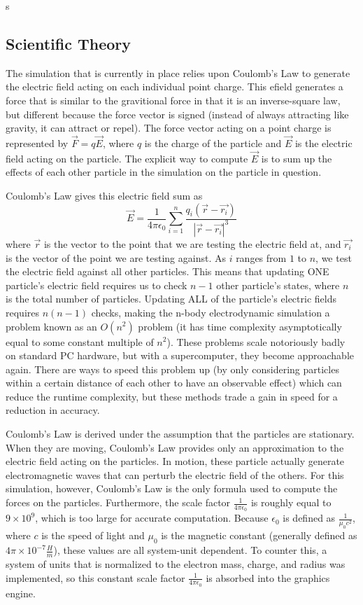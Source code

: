 s\documentclass[10pt]{article}
\begin{document}
\clearpage
\subsection{Scientific Theory}
The simulation that is currently in place relies upon Coulomb's Law to generate the electric field acting on each individual point charge. This efield generates a force that is similar to the gravitional force in that it is an inverse-square law, but different because the force vector is signed (instead of always attracting like gravity, it can attract or repel). The force vector acting on a point charge is represented by $\vec{F} = q\vec{E}$, where $q$ is the charge of the particle and $\vec{E}$ is the electric field acting on the particle. The explicit way to compute $\vec{E}$ is to sum up the effects of each other particle in the simulation on the particle in question.

Coulomb's Law gives this electric field sum as $$\vec{E} = \frac{1}{4\pi\epsilon_0}\sum_{i = 1}^n \frac{q_i (\vec{r} - \vec{r_i})}{|\vec{r} - \vec{r_i}|^3}$$ where $\vec{r}$ is the vector to the point that we are testing the electric field at, and $\vec{r_i}$ is the vector of the point we are testing against. As $i$ ranges from $1$ to $n$, we test the electric field against all other particles. This means that updating ONE particle's electric field requires us to check $n-1$ other particle's states, where $n$ is the total number of particles. Updating ALL of the particle's electric fields requires $n(n-1)$ checks, making the n-body electrodynamic simulation a problem known as an $O(n^2)$ problem (it has time complexity asymptotically equal to some constant multiple of $n^2$). These problems scale notoriously badly on standard PC hardware, but with a supercomputer, they become approachable again. There are ways to speed this problem up (by only considering particles within a certain distance of each other to have an observable effect) which can reduce the runtime complexity, but these methods trade a gain in speed for a reduction in accuracy.

Coulomb's Law is derived under the assumption that the particles are stationary. When they are moving, Coulomb's Law provides only an approximation to the electric field acting on the particles. In motion, these particle actually generate electromagnetic waves that can perturb the electric field of the others. For this simulation, however, Coulomb's Law is the only formula used to compute the forces on the particles. Furthermore, the scale factor $\frac{1}{4\pi\epsilon_0}$ is roughly equal to $9 \times 10^9$, which is too large for accurate computation. Because $\epsilon_0$ is defined as $\frac{1}{\mu_0 c^2}$, where $c$ is the speed of light and $\mu_0$ is the magnetic constant (generally defined as $4\pi \times 10^{-7} \frac{H}{m}$), these values are all system-unit dependent. To counter this, a system of units that is normalized to the electron mass, charge, and radius was implemented, so this constant scale factor $\frac{1}{4\pi\epsilon_0}$ is absorbed into the graphics engine.
\end{document}
